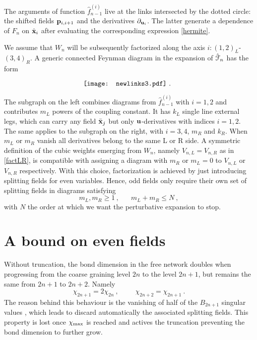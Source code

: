 \documentclass[a4paper,preprintnumbers,nofootinbib,twocolumn]{quantumarticle}
\newcommand{\be}{\begin{equation}} \newcommand{\ee}{\end{equation}}
\begin{document}
\noindent
The arguments of function ${\hat f}^{(i)}_{n-1}$ live at the links intersected by the dotted circle: the shifted fields ${\bf p}_{i,i+1}$ and the derivatives $\partial_{{\bf u}_i}$.
The latter generate a dependence of $F_n$ on ${\hat {\bf x}}_i$ after evaluating the corresponding expression \eqref{hermite}.

We assume that $W_n$ will be subsequently factorized along the axis $i: (1,2)_L$-$(3,4)_R$.
A generic connected Feynman diagram in the expansion of ${\hat {\cal F}}_n$ has the form

\begin{equation}
\vcenter{\hbox{
\hspace{-14mm} 
\texttt{[image: newlinks3.pdf]}}} 
\ .
\hspace{-10mm} 
\label{LRgraph}
\end{equation}

\noindent 
The subgraph on the left combines diagrams from ${\hat f}_{n-1}^{(i)}$ with $i=1,2$ and contributes $m_L$ powers of the coupling constant. It has $k_L$ single line external legs, 
which can carry any field ${\bar {\bf x}}_j$ but only ${\bf u}$-derivatives with indices $i=1,2$. 
The same applies to the subgraph on the right, with $i=3,4$, $m_R$ and $k_R$. 
When $m_L$ or $m_R$ vanish all derivatives belong to the same L or R side.
A symmetric definition of the cubic weights emerging from $W_n$, namely $V_{n,L}=V_{n,R}$ as in \eqref{factLR}, is compatible with assigning
a diagram with $m_R$ or $m_L=0$ to $V_{n,L}$ or $V_{n,R}$ respectively. 
With this choice, factorization is achieved by just introducing splitting fields for even variables.
Hence, odd fields only require their own set of splitting fields in diagrams satisfying
\be
m_L, m_R \geq 1 \ , \;\;\;\;\;\; m_L+m_R \leq N \ ,
\label{oddfact}
\ee
with $N$ the order at which we want the perturbative expansion to stop.

\section{A bound on even fields}

Without truncation, the bond dimension in the free network doubles when progressing from the coarse graining level $2n$ to the level $2n+1$, but remains the same from $2n+1$ to $2n+2$. Namely
\be
\chi_{2n+1}=2 \chi_{2n} \ , \hspace{1cm}  \chi_{2n+2}=\chi_{2n+1} \ .
\label{chi3}
\ee
The reason behind this behaviour is the vanishing of half of the $B_{2n+1}$ singular values \cite{CS19}, which leads to discard automatically the associated splitting fields.
This property is lost once $\chi_{\rm max}$ is reached and actives the truncation preventing the bond dimension to further grow.
\end{document}
